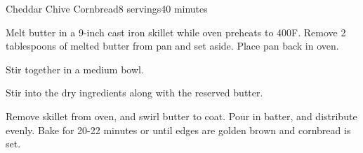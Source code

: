 \documentclass[../Cookbook.tex]{subfiles}
\begin{document}
\begin{recipe}{Cheddar Chive Cornbread}{8 servings}{40 minutes}

Melt butter in a 9-inch cast iron skillet while oven preheats to 400\0F. Remove 2 tablespoons of melted butter from pan and set aside. Place pan back in oven.

Stir together in a medium bowl.

Stir into the dry ingredients along with the reserved butter.

Remove skillet from oven, and swirl butter to coat. Pour in batter, and distribute evenly. Bake for 20-22 minutes or until edges are golden brown and cornbread is set.

\end{recipe}
\end{document}
